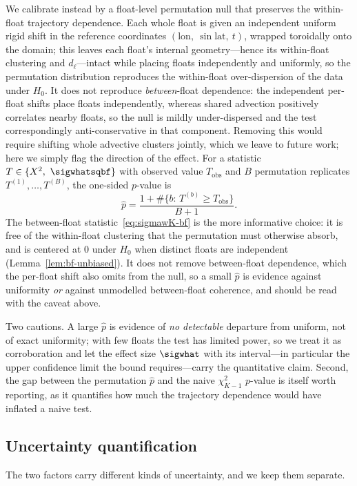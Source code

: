 We calibrate instead by a float-level permutation null that preserves
the within-float trajectory dependence. Each whole float is given an
independent uniform rigid shift in the reference coordinates
$(\mathrm{lon},\ \sin\mathrm{lat},\ t)$, wrapped toroidally onto the
domain; this leaves each float's internal geometry---hence its
within-float clustering and $d_\ell$---intact while placing floats
independently and uniformly, so the permutation distribution reproduces
the within-float over-dispersion of the data under $H_0$. It does not
reproduce \emph{between}-float dependence: the independent per-float
shifts place floats independently, whereas shared advection positively
correlates nearby floats, so the null is mildly under-dispersed and the
test correspondingly anti-conservative in that component. Removing this
would require shifting whole advective clusters jointly, which we leave
to future work; here we simply flag the direction of the effect. For a statistic
$T\in\{X^2,\ \sigwhatsqbf\}$ with observed
value $T_{\mathrm{obs}}$ and $B$ permutation replicates
$T^{(1)},\dots,T^{(B)}$, the one-sided $p$-value is
\[
  \hat p=\frac{1+\#\{b:\,T^{(b)}\ge T_{\mathrm{obs}}\}}{B+1}.
\]
The between-float statistic~\eqref{eq:sigmawK-bf} is the more
informative choice: it is free of the within-float clustering that the
permutation must otherwise absorb, and is centered at $0$ under $H_0$
when distinct floats are independent (Lemma~\ref{lem:bf-unbiased}). It
does not remove between-float dependence, which the per-float shift also
omits from the null, so a small $\hat p$ is evidence against uniformity
\emph{or} against unmodelled between-float coherence, and should be read
with the caveat above.

Two cautions. A large $\hat p$ is evidence of \emph{no detectable}
departure from uniform, not of exact uniformity; with few floats the
test has limited power, so we treat it as corroboration and let the
effect size $\sigwhat$ with its interval---in particular the upper
confidence limit the bound requires---carry the quantitative claim.
Second, the gap between the permutation $\hat p$ and the naive
$\chi^2_{K-1}$ $p$-value is itself worth reporting, as it quantifies how
much the trajectory dependence would have inflated a naive test.

\subsection{Uncertainty quantification}
\label{sec:uncertainty}

The two factors carry different kinds of uncertainty, and we keep them
separate.

